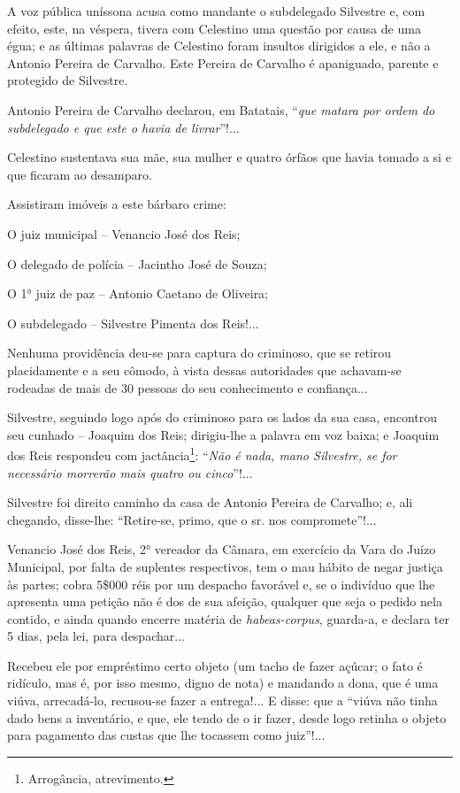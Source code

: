 A voz pública uníssona acusa como mandante o subdelegado Silvestre e,
com efeito, este, na véspera, tivera com Celestino uma questão por causa
de uma égua; e as últimas palavras de Celestino foram insultos dirigidos
a ele, e não a Antonio Pereira de Carvalho. Este Pereira de Carvalho é
apaniguado, parente e protegido de Silvestre.

Antonio Pereira de Carvalho declarou, em Batatais, ``\emph{que matara por
ordem do subdelegado e que este o havia de livrar}''!...

Celestino sustentava sua mãe, sua mulher e quatro órfãos que havia
tomado a si e que ficaram ao desamparo.

Assistiram imóveis a este bárbaro crime:

O juiz municipal -- Venancio José dos Reis;

O delegado de polícia -- Jacintho José de Souza;

O 1° juiz de paz -- Antonio Caetano de Oliveira;

O subdelegado -- Silvestre Pimenta dos Reis!...

Nenhuma providência deu-se para captura do criminoso, que se retirou
placidamente e a seu cômodo, à vista dessas autoridades que achavam-se
rodeadas de mais de 30 pessoas do seu conhecimento e confiança...

Silvestre, seguindo logo após do criminoso para os lados da sua casa,
encontrou seu cunhado -- Joaquim dos Reis; dirigiu-lhe a palavra em voz
baixa; e Joaquim dos Reis respondeu com jactância\footnote{ Arrogância,
  atrevimento.}: ``\emph{Não é nada, mano Silvestre, se for necessário
morrerão mais quatro ou cinco}''!...

Silvestre foi direito caminho da casa de Antonio Pereira de Carvalho; e,
ali chegando, disse-lhe: ``Retire-se, primo, que o sr. nos
compromete''!...

Venancio José dos Reis, 2° vereador da Câmara, em exercício da Vara do
Juízo Municipal, por falta de suplentes respectivos, tem o mau hábito de
negar justiça às partes; cobra 5\$000 réis por um despacho favorável e,
se o indivíduo que lhe apresenta uma petição não é dos de sua afeição,
qualquer que seja o pedido nela contido, e ainda quando encerre matéria
de \emph{habeas-corpus}, guarda-a, e declara ter 5 dias, pela lei, para
despachar...

Recebeu ele por empréstimo certo objeto (um tacho de fazer açúcar; o
fato é ridículo, mas é, por isso mesmo, digno de nota) e mandando a
dona, que é uma viúva, arrecadá-lo, recusou-se fazer a entrega!... E
disse: que a ``viúva não tinha dado bens a inventário, e que, ele tendo
de o ir fazer, desde logo retinha o objeto para pagamento das custas que
lhe tocassem como juiz''!...

